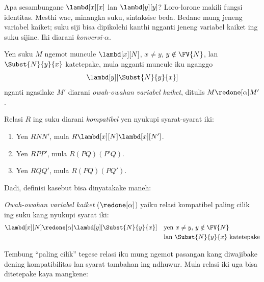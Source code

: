\documentclass[../../../include/open-logic-section]{subfiles}
\begin{document}

Apa sesambungane $\lambd[x][x]$ lan
$\lambd[y][y]$? Loro-lorone makili
fungsi identitas. Mesthi wae, minangka
suku, sintaksise beda. Bedane mung
jeneng variabel kaiket; suku siji bisa
dipikolehi kanthi ngganti jeneng
variabel kaiket ing suku sijine.
Iki diarani \emph{konversi-$\alpha$}.

\begin{defn}
  Yen suku $M$ ngemot muncule
  $\lambd[x][N]$, $x \neq y$,
  $y \notin \FV{N}$, lan
  $\Subst{N}{y}{x}$ katetepake,
  mula ngganti muncule iku nganggo
  \begin{equation*}
    \lambd[y][\Subst{N}{y}{x}]
  \end{equation*}
  nganti ngasilake $M'$ diarani
  \emph{owah-owahan variabel kaiket},
  ditulis $M \redone[\alpha] M'$.
\end{defn}

\begin{defn}
  Relasi $R$ ing suku diarani
  \emph{kompatibel} yen nyukupi
  syarat-syarat iki:
  \begin{enumerate}
  \item Yen $R N N'$, mula
    $R \lambd[x][N] \lambd[x][N']$.
  \item Yen $R P P'$, mula $R (PQ) (P'Q)$.
  \item Yen $R Q Q'$, mula $R (PQ) (PQ')$.
  \end{enumerate}
\end{defn}

Dadi, definisi kasebut bisa
dinyatakake maneh:
\begin{defn}
  \emph{Owah-owahan variabel kaiket}
  ($\redone[\alpha]$) yaiku relasi
  kompatibel paling cilik ing suku
  kang nyukupi syarat iki:
  \begin{align*}
    &\lambd[x][N] \redone[\alpha] \lambd[y][\Subst{N}{y}{x}] && \text{yen
      $x \neq y$, $y \notin \FV{N}$} \\
    & &&\text{lan $\Subst{N}{y}{x}$ katetepake}
  \end{align*}
\end{defn}

Tembung ``paling cilik'' tegese relasi
iku mung ngemot pasangan kang diwajibake
dening kompatibilitas lan syarat tambahan
ing ndhuwur. Mula relasi iki uga bisa
ditetepake kaya mangkene:
\end{document}

